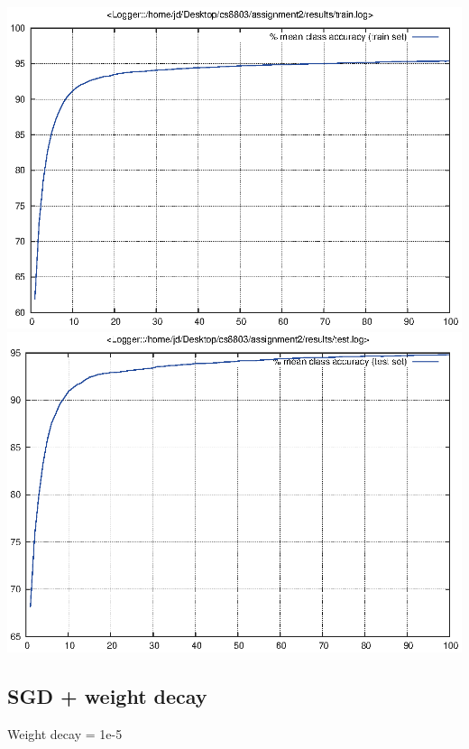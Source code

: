 \documentclass[twoside,12pt]{article}
\newcommand{\imsize}{0.5\linewidth}
\begin{document}
\includegraphics[width=\imsize]{assignment2/results/sgd_d6_train}
\includegraphics[width=\imsize]{assignment2/results/sgd_d6_test}

\subsection{SGD + weight decay}

Weight decay = 1e-5
\end{document}
